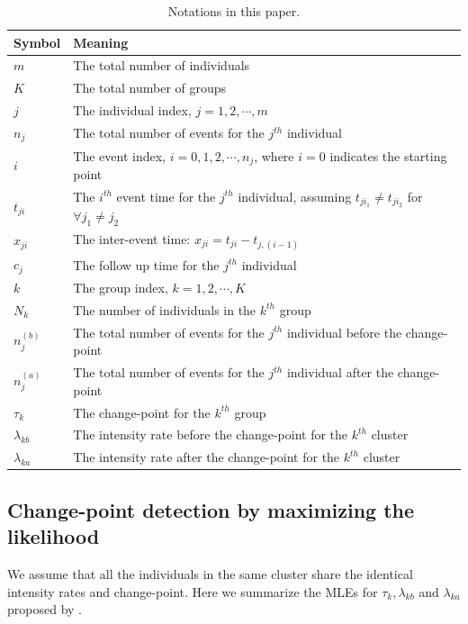 \documentclass[12pt]{article}
\begin{document}
\begin{table} [htp]
   \caption{\label{tab:setadd1} Notations in this paper.}
     \vspace{1ex}
  \centering
  \begin{tabular}{ll}\hline
      Symbol& Meaning \\\hline
      $m$       & The total number of individuals \\
      $K$       & The total number of groups \\
      $j$       & The individual index, $j=1,2,\cdots,m$ \\
      $n_j$     & The total number of events for the $j^{th}$ individual\\
      $i$       & The event index, $i = 0, 1, 2, \cdots,n_j$, where $i = 0$ indicates the starting point\\
      $t_{ji}$  & The $i^{th}$ event time for the $j^{th}$ individual, assuming $t_{ji_1}\not=t_{ji_2}$ for $\forall j_1\not=j_2$   \\
      $x_{ji}$  & The inter-event time: $x_{ji} = t_{ji} - t_{j,(i-1)}$ \\
    $c_j$     & The follow up time for the $j^{th}$ individual\\
      $k$       & The group index, $k=1,2,\cdots,K$\\
    $N_k$     & The number of individuals in the $k^{th}$ group\\
    $n_j^{(b)}$ & The total number of events for the $j^{th}$ individual before the change-point\\
    $n_j^{(a)}$ & The total number of events for the $j^{th}$ individual after the change-point\\
       $\tau_k$  & The change-point for the $k^{th}$ group\\
      $\lambda_{kb}$& The intensity rate before the change-point for the $k^{th}$ cluster \\
      $\lambda_{ka}$& The intensity rate after the change-point for the $k^{th}$ cluster \\
      \hline
 \end{tabular}%
  \end{table}%
\subsection {Change-point detection by maximizing the likelihood}\label{sec:MLE}
We assume that all the individuals in the same cluster share the identical intensity rates and change-point. Here we summarize the MLEs for $\tau_k,\lambda_{kb}$ and $\lambda_{ka}$ proposed by \citet{Frobish2009}.
\end{document}
